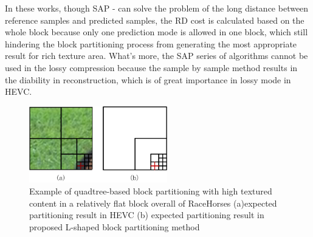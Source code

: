 \documentclass[journal]{IEEEtran}
\begin{document}
In these works, though SAP \cite{09}-\cite{12} can solve the problem of the long distance between reference samples and predicted samples, the RD cost is calculated based on the whole block because only one prediction mode is allowed in one block, which still hindering the block partitioning process from generating the most appropriate result for rich texture area. What's more, the SAP series of algorithms cannot be used in the lossy compression because the sample by sample method results in the diability in reconstruction, which is of great importance in lossy mode in HEVC.

\begin{figure}[htpb]
\centering
\includegraphics[width=6cm]{pictures/l-shaped block illustration}
\caption{Example of quadtree-based block partitioning with high textured content in a relatively flat block overall of RaceHorses (a)expected partitioning result in HEVC (b) expected partitioning result in proposed L-shaped block partitioning method}
\label{fig:l-shaped block}
\end{figure}
\end{document}
